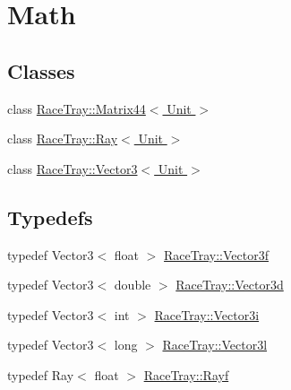 \hypertarget{group___math}{\section{Math}
\label{group___math}
}
\subsection*{Classes}
\begin{DoxyCompactItemize}
\item 
class \hyperlink{class_race_tray_1_1_matrix44}{Race\-Tray\-::\-Matrix44$<$ Unit $>$}
\item 
class \hyperlink{class_race_tray_1_1_ray}{Race\-Tray\-::\-Ray$<$ Unit $>$}
\item 
class \hyperlink{class_race_tray_1_1_vector3}{Race\-Tray\-::\-Vector3$<$ Unit $>$}
\end{DoxyCompactItemize}
\subsection*{Typedefs}
\begin{DoxyCompactItemize}
\item 
typedef Vector3$<$ float $>$ \hyperlink{group___math_gadb6fa781064c3c3c9b13eb984adae162}{Race\-Tray\-::\-Vector3f}
\item 
typedef Vector3$<$ double $>$ \hyperlink{group___math_ga3cf322716609965f0debf240c4eb8ab6}{Race\-Tray\-::\-Vector3d}
\item 
typedef Vector3$<$ int $>$ \hyperlink{group___math_ga732981bed6c760c8857decb1e04b2118}{Race\-Tray\-::\-Vector3i}
\item 
typedef Vector3$<$ long $>$ \hyperlink{group___math_ga7d214bec28c2592b61b69cbf169d45cf}{Race\-Tray\-::\-Vector3l}
\item 
typedef Ray$<$ float $>$ \hyperlink{group___math_ga5fdea6c2a8db84c0cc5b7aaeeb48b17a}{Race\-Tray\-::\-Rayf}
\end{DoxyCompactItemize}
